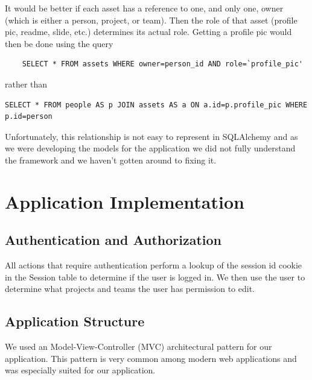\documentclass[12pt]{article}
\begin{document}
It would be better if each asset has a reference to one, and only one, owner
(which is either a person, project, or team). Then the role of that asset
(profile pic, readme, slide, etc.) determines its actual role. Getting a profile
pic would then be done using the query

\begin{verbatim}
    SELECT * FROM assets WHERE owner=person_id AND role=`profile_pic'
\end{verbatim}

rather than

\begin{verbatim}
SELECT * FROM people AS p JOIN assets AS a ON a.id=p.profile_pic WHERE p.id=person
\end{verbatim}

Unfortunately, this relationship is not easy to represent
in SQLAlchemy and as we were developing the models for the application we did
not fully understand the framework and we haven't gotten around to fixing it.

\section{Application Implementation}

\subsection{Authentication and Authorization}
All actions that require authentication perform a lookup of the session id
cookie in the Session table to determine if the user is logged in. We then use
the user to determine what projects and teams the user has permission to edit.

\subsection{Application Structure}
We used an Model-View-Controller (MVC) architectural pattern for our
application. This pattern is very common among modern web applications and was
especially suited for our application.
\end{document}

